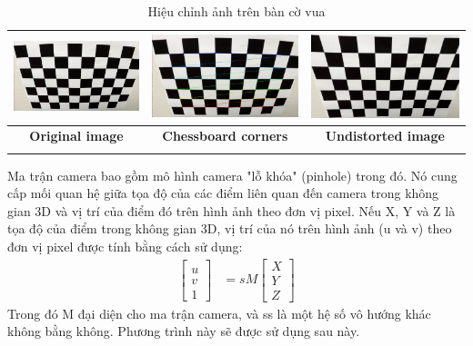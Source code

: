 \begin{table}[h]
    \centering
    \begin{tabular}{|c|c|c|}
        \hline
        \rowcolor[gray]{0.9}
        \includegraphics[width=0.3\linewidth]{images/3-lane/o.jpg} & \includegraphics[width=0.3\linewidth]{images/3-lane/c.jpg} & \includegraphics[width=0.3\linewidth]{images/3-lane/u.jpg} \\
        \hline
        \rowcolor[gray]{0.9}
        \textbf{Original image} & \textbf{Chessboard corners} & \textbf{Undistorted image} \\
        \hline
        \rowcolor[gray]{0.9}
    \end{tabular}
        \caption{Hiệu chỉnh ảnh trên bàn cờ vua}
\end{table}

\noindent Ma trận camera bao gồm mô hình camera "lỗ khóa" (pinhole) trong đó. Nó cung cấp mối quan hệ giữa tọa độ của các điểm liên quan đến camera trong không gian 3D và vị trí của điểm đó trên hình ảnh theo đơn vị pixel. Nếu X, Y và Z là tọa độ của điểm trong không gian 3D, vị trí của nó trên hình ảnh (u và v) theo đơn vị pixel được tính bằng cách sử dụng:
\newline
\begin{equation*}
    \begin{aligned}
        \left[
    \begin{array}{c}
    \\
         u  \\
         v  \\
         1
    \end{array}   
\right]
&= sM
\left[
    \begin{array}{c}
    
         X  \\
         Y  \\
         Z
    \end{array}   
\right]
    \end{aligned}
\end{equation*}
Trong đó M đại diện cho ma trận camera, và ss là một hệ số vô hướng khác không bằng không. Phương trình này sẽ được sử dụng sau này.
\newpage
